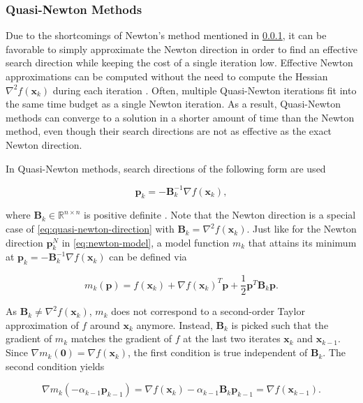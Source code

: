 \subsubsection{Quasi-Newton Methods}\label{sss:quasi-newton}
Due to the shortcomings of Newton's method mentioned in \cref{sss:quasi-newton}, it can be favorable to simply approximate the Newton 
direction
in order to find an effective search direction while keeping the cost of a single iteration low. Effective Newton approximations can be 
computed without the need to compute the Hessian $\nabla^2 f(\bm{x}_k)$ during each iteration \cite{nocedal2006}. Often, multiple Quasi-Newton 
iterations fit into the same time budget as a single Newton iteration. As a result, Quasi-Newton methods can converge to a solution in a 
shorter amount of time than the Newton method, even though their search directions are not as effective as the exact Newton direction.

In Quasi-Newton methods, search directions of the following form are used

\begin{equation}\label{eq:quasi-newton-direction}
    \bm{p}_k = -\bm{B}^{-1}_k \nabla f(\bm{x}_k),
\end{equation}

\noindent where $\bm{B}_k \in \mathbb{R}^{n \times n}$ is positive definite \cite{nocedal2006}. Note that the Newton direction is a special 
case of 
\cref{eq:quasi-newton-direction} with $\bm{B}_k = \nabla^2 f(\bm{x}_k)$. Just like for the Newton direction $\bm{p}^N_k$ in
\cref{eq:newton-model}, a model function $m_k$ 
that attains its minimum at $\bm{p}_k  = -\bm{B}^{-1}_k \nabla f(\bm{x}_k)$ can be defined via

\begin{equation}\label{eq:quasi-newton-model}
    m_k(\bm{p}) = f(\bm{x}_k)  + \nabla f(\bm{x}_k)^T \bm{p} + \frac{1}{2} \bm{p}^T\bm{B}_k\bm{p}.
\end{equation}

\noindent As $\bm{B}_k \neq \nabla^2 f(\bm{x}_k)$, $m_k$ does not correspond to a second-order Taylor approximation of $f$ around 
$\bm{x}_k$ anymore. Instead, $\bm{B}_k$ is picked such that the gradient of $m_k$ matches the gradient of $f$ at the last two iterates 
$\bm{x}_k$ and $\bm{x}_{k-1}$.
Since $\nabla m_{k}(\bm{0}) = \nabla f(\bm{x}_k)$, the first condition is true independent of $\bm{B}_k$. The 
second condition yields

\[
    \nabla m_{k}(-\alpha_{k-1}\bm{p}_{k-1}) = \nabla f(\bm{x}_k) - \alpha_{k-1}\bm{B}_{k}\bm{p}_{k-1} = \nabla f(\bm{x}_{k-1}).
\]

